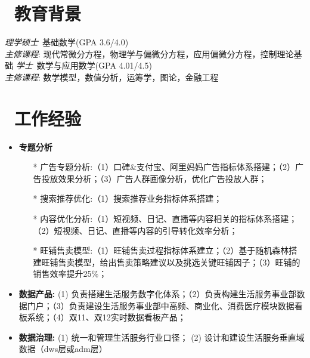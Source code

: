 \documentclass{resume}
\begin{document}


 
\section{\faGraduationCap\  教育背景}
\textit{理学硕士}\ 基础数学(GPA 3.6/4.0)\\
\textit{主修课程}:
现代常微分方程，物理学与偏微分方程，应用偏微分方程，控制理论基础
\textit{学士}\ 数学与应用数学(GPA 4.01/4.5)\\
\textit{主修课程}:
数学模型，数值分析，运筹学，图论，金融工程

\section{\faUsers\ 工作经验}
\role{资深数据分析师}{}
\begin{onehalfspacing}
  \begin{itemize}
    \item \textbf{专题分析}
    \begin{itemize}
      \item[*] 广告专题分析:（1）口碑\&支付宝、阿里妈妈广告指标体系搭建；（2）广告投放效果分析；（3）广告人群画像分析，优化广告投放人群；
      \item[*] 搜索推荐优化:（1）搜索推荐业务指标体系搭建；
      \item[*] 内容优化分析:（1）短视频、日记、直播等内容相关的指标体系搭建；（2）短视频、日记、直播等内容的引导转化效率分析；
      \item[*] 旺铺售卖模型:（1）旺铺售卖过程指标体系建立；（2）基于随机森林搭建旺铺售卖模型，给出售卖策略建议以及挑选关键旺铺因子；（3）旺铺的销售效率提升25\%； 
    \end{itemize}
    \item \textbf{数据产品:} (1) 负责搭建生活服务数字化体系；（2）负责构建生活服务事业部数据门户；（3）负责建设生活服务事业部中高频、商业化、消费医疗模块数据看板系统；（4）双11、双12实时数据看板产品；
    \item \textbf{数据治理:} (1) 统一和管理生活服务行业口径； (2) 设计和建设生活服务垂直域数据（dws层或adm层）
  \end{itemize}
\end{onehalfspacing}
\end{document}
